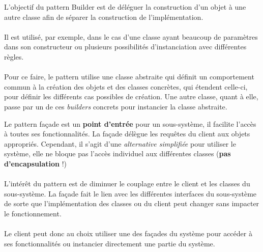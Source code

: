 \item{}
{\vrai}
{L'objectif du pattern Builder est de déléguer la construction d'un objet à une autre classe afin de séparer la construction de l'implémentation.
\paragraph{}Il est utilisé, par exemple, dans le cas d'une classe ayant beaucoup de paramètres dans son constructeur ou plusieurs possibilités d'instanciation avec différentes règles.
\paragraph{}
Pour ce faire, le pattern utilise une classe abstraite qui définit un comportement commun à la création des objets et des classes concrètes, qui étendent celle-ci, pour définir les différents cas possibles de création. Une autre classe, quant à elle, passe par un de ces \textit{builders} concrets pour instancier la classe abstraite.
}


\item{}
{\faux}
{Le pattern façade est un \textbf{point d'entrée} pour un sous-système, il facilite l'accès à toutes ses fonctionnalités. La façade délègue les requêtes du client aux objets appropriés. Cependant, il s'agit d'une \textit{alternative simplifiée} pour utiliser le système, elle ne bloque pas l'accès individuel aux différentes classes (\textbf{pas d'encapsulation} !)
\paragraph{}
L'intérêt du pattern est de diminuer le couplage entre le client et les classes du sous-système. La façade fait le lien avec les différentes interfaces du sous-système de sorte que l'implémentation des classes ou du client peut changer sans impacter le fonctionnement.
\paragraph{}
Le client peut donc au choix utiliser une des façades du système pour accéder à ses fonctionnalités ou instancier directement une partie du système.
}


